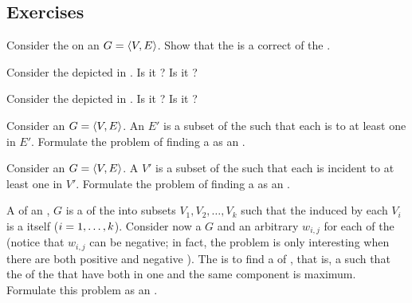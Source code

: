 \begin{definition}
\section*{Exercises}
\begin{exercise}
Consider the  on an  $G=\tupl{V,E}$. Show that the   is a correct  of the .
\end{exercise}
\begin{exercise}
Consider the  depicted in . Is it ? Is it ?
\end{exercise}
\begin{exercise}
Consider the  depicted in . Is it ? Is it ?
\end{exercise}
\begin{exercise}
Consider an  $G=\tupl{V,E}$. An  $E'$ is a subset of the  such that each  is  to at least one  in $E'$. Formulate the problem of finding a  as an .
\end{exercise}
\begin{exercise}
Consider an  $G=\tupl{V,E}$. A  $V'$ is a subset of the  such that each  is incident to at least one  in $V'$. Formulate the problem of finding a  as an .
\end{exercise}
\begin{exercise}
A  of an ,  $G$ is a  of the  into subsets $V_1,V_2,\ldots,V_k$ such that the  induced by each $V_i$ is a  itself ($\rangei[i]{1}{k}$). Consider now a  $G$ and an arbitrary  $w_{i,j}$ for each  of the  (notice that $w_{i,j}$ can be negative; in fact, the problem is only interesting when there are both positive and negative  ). The  is to find a  of , that is, a  such that the  of the  that have both  in one and the same component is maximum. Formulate this problem as an .

\end{exercise}
\end{definition}
